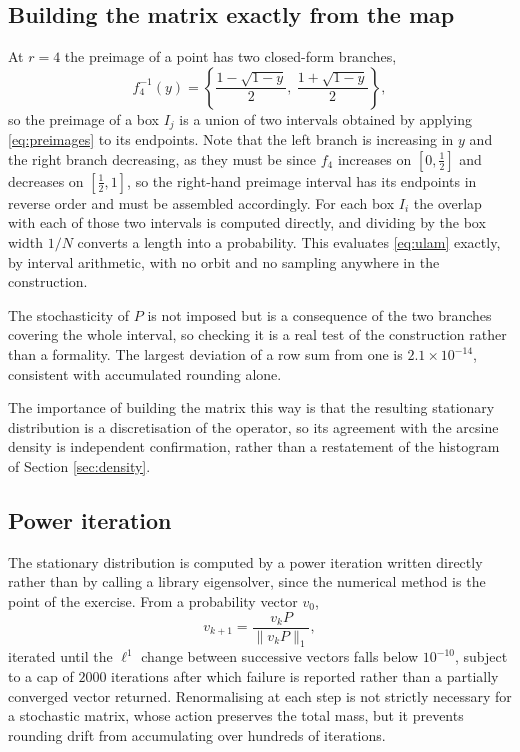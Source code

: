 \documentclass[11pt,a4paper]{article}
\theoremstyle{definition}
\theoremstyle{remark}
\begin{document}
\subsection{Building the matrix exactly from the map}

At $r=4$ the preimage of a point has two closed-form branches,
\begin{equation}
  f_4^{-1}(y) = \left\{\frac{1-\sqrt{1-y}}{2},\ \frac{1+\sqrt{1-y}}{2}\right\} ,
  \label{eq:preimages}
\end{equation}
so the preimage of a box $I_j$ is a union of two intervals obtained by
applying \eqref{eq:preimages} to its endpoints. Note that the left branch is
increasing in $y$ and the right branch decreasing, as they must be since $f_4$
increases on $[0,\tfrac12]$ and decreases on $[\tfrac12,1]$, so the right-hand
preimage interval has its endpoints in reverse order and must be assembled
accordingly. For
each box $I_i$ the overlap with each of those two intervals is computed
directly, and dividing by the box width $1/N$ converts a length into a
probability. This evaluates \eqref{eq:ulam} exactly, by interval arithmetic,
with no orbit and no sampling anywhere in the construction.

The stochasticity of $P$ is not imposed but is a consequence of the two
branches covering the whole interval, so checking it is a real test of the
construction rather than a formality. The largest deviation of a row sum from
one is $2.1\times10^{-14}$, consistent with accumulated rounding alone.

The importance of building the matrix this way is that the resulting
stationary distribution is a discretisation of the operator, so its
agreement with the arcsine density is independent confirmation, rather than a
restatement of the histogram of Section \ref{sec:density}.

\subsection{Power iteration}

The stationary distribution is computed by a power iteration written directly
rather than by calling a library eigensolver, since the numerical method is
the point of the exercise. From a probability vector $v_0$,
\begin{equation}
  v_{k+1} = \frac{v_k P}{\|v_k P\|_1} ,
  \label{eq:power}
\end{equation}
iterated until the $\ell^1$ change between successive vectors falls below
$10^{-10}$, subject to a cap of $2000$ iterations after which failure is
reported rather than a partially converged vector returned. Renormalising at
each step is not strictly necessary for a stochastic matrix, whose action
preserves the total mass, but it prevents rounding drift from accumulating
over hundreds of iterations.
\end{document}
